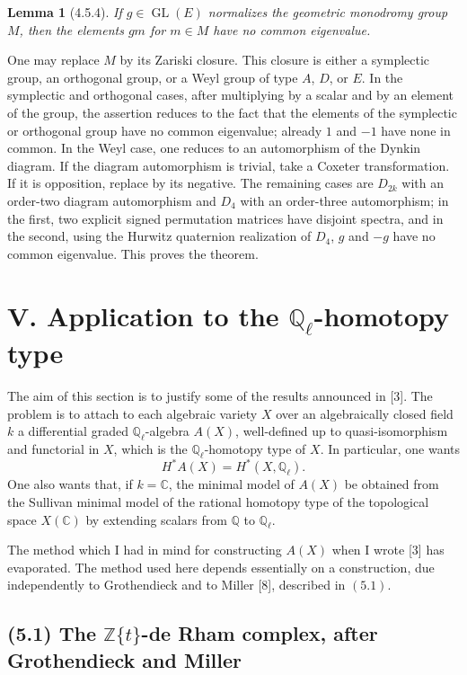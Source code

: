\documentclass[11pt]{article}
\newtheorem{lemma}{Lemma}
\theoremstyle{remark}
\newcommand{\Ql}{\mathbb{Q}_\ell}
\newcommand{\QQ}{\mathbb{Q}}
\newcommand{\CC}{\mathbb{C}}
\begin{document}
\begin{lemma}[4.5.4]
If $g\in\operatorname{GL}(E)$ normalizes the geometric monodromy group $M$, then the elements $gm$ for $m\in M$ have no common eigenvalue.
\end{lemma}

One may replace $M$ by its Zariski closure. This closure is either a symplectic group, an orthogonal group, or a Weyl group of type $A$, $D$, or $E$. In the symplectic and orthogonal cases, after multiplying by a scalar and by an element of the group, the assertion reduces to the fact that the elements of the symplectic or orthogonal group have no common eigenvalue; already $1$ and $-1$ have none in common. In the Weyl case, one reduces to an automorphism of the Dynkin diagram. If the diagram automorphism is trivial, take a Coxeter transformation. If it is opposition, replace by its negative. The remaining cases are $D_{2k}$ with an order-two diagram automorphism and $D_4$ with an order-three automorphism; in the first, two explicit signed permutation matrices have disjoint spectra, and in the second, using the Hurwitz quaternion realization of $D_4$, $g$ and $-g$ have no common eigenvalue. This proves the theorem.



\clearpage
\section*{V. Application to the \texorpdfstring{$\mathbb Q_\ell$}{Q_l}-homotopy type}

The aim of this section is to justify some of the results announced in [3].  The problem is to attach to each algebraic variety \(X\) over an algebraically closed field \(k\) a differential graded \(\Ql\)-algebra \(A(X)\), well-defined up to quasi-isomorphism and functorial in \(X\), which is the \(\Ql\)-homotopy type of \(X\).  In particular, one wants
\[
H^*A(X)=H^*(X,\Ql).
\]
One also wants that, if \(k=\CC\), the minimal model of \(A(X)\) be obtained from the Sullivan minimal model of the rational homotopy type of the topological space \(X(\CC)\) by extending scalars from \(\QQ\) to \(\Ql\).

The method which I had in mind for constructing \(A(X)\) when I wrote [3] has evaporated.  The method used here depends essentially on a construction, due independently to Grothendieck and to Miller [8], described in \((5.1)\).

\subsection*{(5.1) The \(\mathbb Z\{t\}\)-de Rham complex, after Grothendieck and Miller}
\end{document}
